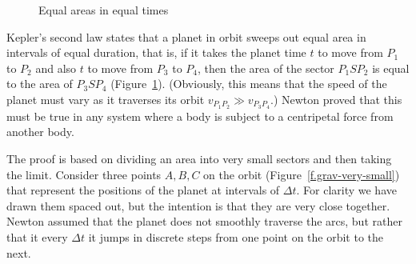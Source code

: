 \begin{figure}[tb]
\begin{minipage}{.5\textwidth}
\begin{center}
\caption{Equal areas in equal times}\label{f.grav-second}
\end{center}
\end{minipage}
\end{figure}


Kepler's second law states that a planet in orbit sweeps out equal area in intervals of equal duration, that is, if it takes the planet time $t$ to move from $P_1$ to $P_2$ and also $t$ to move from $P_3$ to $P_4$, then the area of the sector $P_1SP_2$ is equal to the area of $P_3SP_4$ (Figure~\ref{f.grav-second}). (Obviously, this means that the speed of the planet must vary as it traverses its orbit $v_{P_1P_2} \gg v_{P_3P_4}$.) Newton proved that this must be true in any system where a body is subject to a centripetal force from another body. 

The proof is based on dividing an area into very small sectors and then taking the limit. Consider three points $A,B,C$ on the orbit (Figure~\ref{f.grav-very-small}) that represent the positions of the planet at intervals of $\Delta t$. For clarity we have drawn them spaced out, but the intention is that they are very close together. Newton assumed that the planet does not smoothly traverse the arcs, but rather that it every $\Delta t$ it jumps in discrete steps from one point on the orbit to the next.


